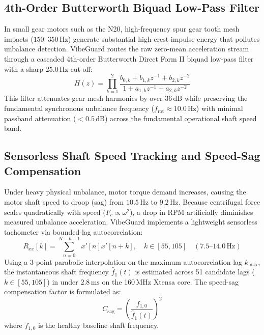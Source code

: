 \subsection{4th-Order Butterworth Biquad Low-Pass Filter}
\hspace{2em}In small gear motors such as the N20, high-frequency spur gear tooth mesh impacts ($150\text{--}350\,\text{Hz}$) generate substantial high-crest impulse energy that pollutes unbalance detection. VibeGuard routes the raw zero-mean acceleration stream through a cascaded 4th-order Butterworth Direct Form II biquad low-pass filter with a sharp $25.0\,\text{Hz}$ cut-off:
\begin{equation}
H(z) = \prod_{k=1}^{2} \frac{b_{0,k} + b_{1,k} z^{-1} + b_{2,k} z^{-2}}{1 + a_{1,k} z^{-1} + a_{2,k} z^{-2}}
\end{equation}
This filter attenuates gear mesh harmonics by over $36\,\text{dB}$ while preserving the fundamental synchronous unbalance frequency ($f_{\mathrm{rot}} \approx 10.0\,\text{Hz}$) with minimal passband attenuation ($<0.5$\,dB) across the fundamental operational shaft speed band.

\subsection{Sensorless Shaft Speed Tracking and Speed-Sag Compensation}
\hspace{2em}Under heavy physical unbalance, motor torque demand increases, causing the motor shaft speed to droop (sag) from $10.5\,\text{Hz}$ to $9.2\,\text{Hz}$. Because centrifugal force scales quadratically with speed ($F_c \propto \omega^2$), a drop in RPM artificially diminishes measured unbalance acceleration. VibeGuard implements a lightweight sensorless tachometer via bounded-lag autocorrelation:
\begin{equation}
R_{xx}[k] = \sum_{n=0}^{N-k-1} x'[n] x'[n+k], \quad k \in [55, 105] \quad (7.5\text{--}14.0\,\text{Hz})
\end{equation}
Using a 3-point parabolic interpolation on the maximum autocorrelation lag $k_{\mathrm{max}}$, the instantaneous shaft frequency $\hat{f}_1(t)$ is estimated across 51 candidate lags ($k \in [55, 105]$) in under $2.8\,\text{ms}$ on the 160\,MHz Xtensa core. The speed-sag compensation factor is formulated as:
\begin{equation}
C_{\mathrm{sag}} = \left(\frac{f_{1,0}}{\hat{f}_1(t)}\right)^2
\end{equation}
where $f_{1,0}$ is the healthy baseline shaft frequency.

